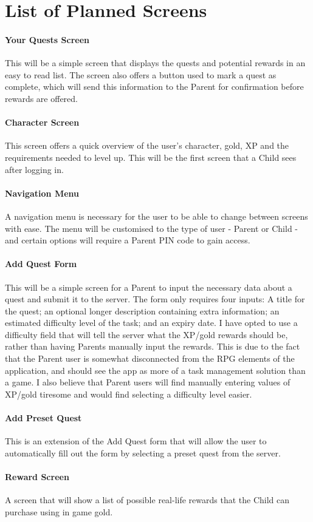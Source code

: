 \chapter{List of Planned Screens}

\subsubsection{Your Quests Screen}
This will be a simple screen that displays the quests and potential rewards in an easy to read list.
The screen also offers a button used to mark a quest as complete, which will send this information to the Parent for confirmation before rewards are offered.

\subsubsection{Character Screen}
This screen offers a quick overview of the user's character, gold, XP and the requirements needed to level up.
This will be the first screen that a Child sees after logging in.

\subsubsection{Navigation Menu}
A navigation menu is necessary for the user to be able to change between screens with ease.
The menu will be customised to the type of user - Parent or Child - and certain options will require a Parent PIN code to gain access. 

\subsubsection{Add Quest Form}
This will be a simple screen for a Parent to input the necessary data about a quest and submit it to the server. 
The form only requires four inputs: A title for the quest; an optional longer description containing extra information; an estimated difficulty level of the task; and an expiry date.
I have opted to use a difficulty field that will tell the server what the XP/gold rewards should be, rather than having Parents manually input the rewards.
This is due to the fact that the Parent user is somewhat disconnected from the RPG elements of the application, and should see the app as more of a task management solution than a game.
I also believe that Parent users will find manually entering values of XP/gold tiresome and would find selecting a difficulty level easier. 

\subsubsection{Add Preset Quest}
This is an extension of the Add Quest form that will allow the user to automatically fill out the form by selecting a preset quest from the server.

\subsubsection{Reward Screen}
A screen that will show a list of possible real-life rewards that the Child can purchase using in game gold.